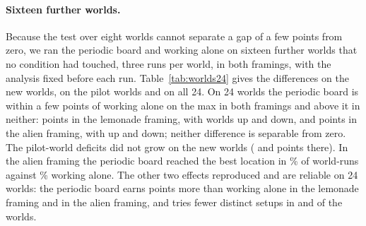\paragraph{Sixteen further worlds.}
Because the test over eight worlds cannot separate a gap of a few points from zero, we ran the periodic board
and working alone on sixteen further worlds that no condition had touched, three runs per world, in both
framings, with the analysis fixed before each run. Table~\ref{tab:worlds24} gives the differences on the new
worlds, on the pilot worlds and on all 24. On 24 worlds the periodic board is within a few points of working
alone on the max in both framings and above it in neither: \WLAllMax{} points in the lemonade framing, with
\WLAllMaxUp{} worlds up and \WLAllMaxDown{} down, and \WAllMax{} points in the alien framing, with
\WAllMaxUp{} up and \WAllMaxDown{} down; neither difference is separable from zero. The pilot-world deficits
did not grow on the new worlds (\WLNewMax{} and \WNewMax{} points there). In the alien framing the periodic
board reached the best location in \WAllReachedArm\% of world-runs against \WAllReachedSolo\% working alone.
The other two effects reproduced and are reliable on 24 worlds: the periodic board earns \WLAllSum{} points
more than working alone in the lemonade framing and \WAllSum{} in the alien framing, and tries fewer distinct
setups in \WLAllUniqDown{} and \WAllUniqDown{} of the \WAllUniqN{} worlds.

\begin{table}[t]
  \centering
  \caption{On 24 worlds the periodic board is within a few points of working alone on the max in both framings, with intervals that include zero, and keeps the earnings gain. Sharing at rounds 6, 11 and 16 relative to working alone, paired over worlds. Three runs per world. Max and cumulative earnings in percentage points of the optimum; distinct setups in counts; reached best location in percentage points of world-runs.}
  \label{tab:worlds24}
  \scriptsize
  \setlength{\tabcolsep}{3.5pt}
  
\end{table}

\begin{table}[t]
  \centering
  \caption{No sharing condition is reliably above working alone on the max; every one earns more over the game, and most explore less. Each sharing condition's difference from working alone, paired within worlds, all runs. Max and cumulative earnings in percentage points; distinct setups in counts. $^{\ast}$ marks $p<0.05$ on the exact sign-flip test.}
  \label{tab:percondition}
  \small
  \setlength{\tabcolsep}{4pt}
  
\end{table}

